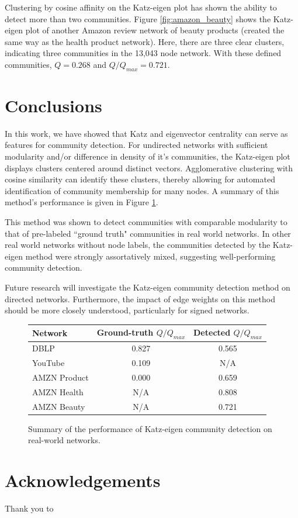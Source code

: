 \documentclass{IEEEtran}
\begin{document}
	Clustering by cosine affinity on the Katz-eigen plot has shown the ability to detect more than two communities. Figure \ref{fig:amazon_beauty} shows the Katz-eigen plot of another Amazon review network of beauty products (created the same way as the health product network). Here, there are three clear clusters, indicating three communities in the 13,043 node network. With these defined communities, $Q=0.268$ and $Q/Q_{max}=0.721$.
	
	
	\section{Conclusions}
	\label{s:conc}
	In this work, we have showed that Katz and eigenvector centrality can serve as features for community detection. For undirected networks with sufficient modularity and/or difference in density of it's communities, the Katz-eigen plot displays clusters centered around distinct vectors. Agglomerative clustering with cosine similarity can identify these clusters, thereby allowing for automated identification of community membership for many nodes. A summary of this method's performance is given in Figure \ref{tab:performance}.
	
	This method was shown to detect communities with comparable modularity to that of pre-labeled ``ground truth" communities in real world networks. In other real world networks without node labels, the communities detected by the Katz-eigen method were strongly assortatively mixed, suggesting well-performing community detection.
	
	Future research will investigate the Katz-eigen community detection method on directed networks. Furthermore, the impact of edge weights on this method should be more closely understood, particularly for signed networks.
	
	\begin{figure}
		\centering
		\begin{tabular}{lcc}
			\toprule
			\textbf{Network} & \textbf{Ground-truth} $Q/Q_{max}$ & \textbf{Detected $Q/Q_{max}$}\\
			\midrule
			DBLP & 0.827 & 0.565\\
			YouTube & 0.109 & N/A\\
			AMZN Product & 0.000 & 0.659\\
			AMZN Health & N/A & 0.808\\
			AMZN Beauty & N/A & 0.721\\
			\bottomrule
		\end{tabular}
		\caption{Summary of the performance of Katz-eigen community detection on real-world networks.}
		\label{tab:performance}
	\end{figure}
	
	\section*{Acknowledgements}
	Thank you to \textellipsis

	
	
\end{document}
